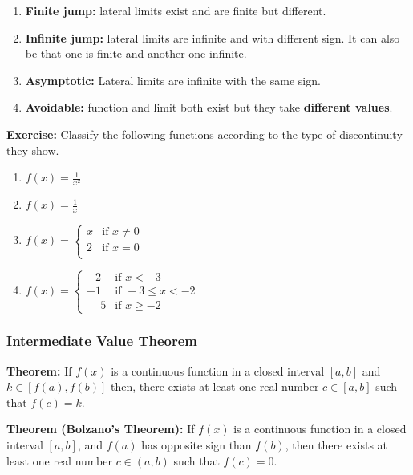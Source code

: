 \documentclass[11pt]{article}
\providecommand{\tightlist}{%
      \setlength{\itemsep}{0pt}\setlength{\parskip}{0pt}}
\begin{document}
\begin{enumerate}
\def\labelenumi{\arabic{enumi}.}
\tightlist
\item
  \textbf{Finite jump:} lateral limits exist and are finite but
  different.
\item
  \textbf{Infinite jump:} lateral limits are infinite and with different
  sign. It can also be that one is finite and another one infinite.
\item
  \textbf{Asymptotic:} Lateral limits are infinite with the same sign.
\item
  \textbf{Avoidable:} function and limit both exist but they take
  \textbf{different values}.
\end{enumerate}

\textbf{Exercise:} Classify the following functions according to the
type of discontinuity they show.

\begin{enumerate}
\def\labelenumi{\arabic{enumi}.}
\tightlist
\item
  \(f(x) = \frac{1}{x^2}\)
\item
  \(f(x) = \frac{1}{x}\)
\item
  \(f(x) = \begin{cases} x & \text{if } x\neq 0 \\ 2 & \text{if } x = 0 \\ \end{cases}\)
\item
  \(f(x) = \begin{cases} -2 & \text{if } x < -3 \\ -1 & \text{if } -3\leq x < -2 \\ \phantom{-}5 & \text{if } x \geq -2 \end{cases}\)
\end{enumerate}

\hypertarget{intermediate-value-theorem}{%
\subsubsection{Intermediate Value
Theorem}\label{intermediate-value-theorem}}

\textbf{Theorem:} If \(f(x)\) is a continuous function in a closed
interval \([a,b]\) and \(k\in[f(a),f(b)]\) then, there exists at least
one real number \(c\in[a,b]\) such that \(f(c) = k\).

\textbf{Theorem (Bolzano's Theorem):} If \(f(x)\) is a continuous
function in a closed interval \([a, b]\), and \(f(a)\) has opposite sign
than \(f(b)\), then there exists at least one real number \(c\in(a, b)\)
such that \(f(c) = 0\).
\end{document}
